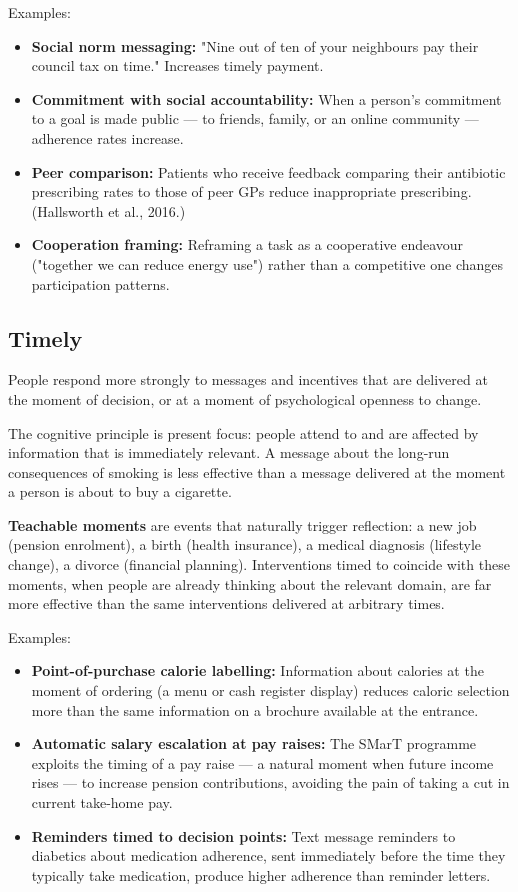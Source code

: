\documentclass[12pt, letterpaper]{article}
\begin{document}
Examples:
\begin{itemize}
\item \textbf{Social norm messaging:} "Nine out of ten of your neighbours pay their council tax on time." Increases timely payment.
\item \textbf{Commitment with social accountability:} When a person's commitment to a goal is made public --- to friends, family, or an online community --- adherence rates increase.
\item \textbf{Peer comparison:} Patients who receive feedback comparing their antibiotic prescribing rates to those of peer GPs reduce inappropriate prescribing. (Hallsworth et al., 2016.)
\item \textbf{Cooperation framing:} Reframing a task as a cooperative endeavour ("together we can reduce energy use") rather than a competitive one changes participation patterns.
\end{itemize}


\subsection{Timely}


People respond more strongly to messages and incentives that are delivered at the moment of decision, or at a moment of psychological openness to change.

The cognitive principle is present focus: people attend to and are affected by information that is immediately relevant. A message about the long-run consequences of smoking is less effective than a message delivered at the moment a person is about to buy a cigarette.

\textbf{Teachable moments} are events that naturally trigger reflection: a new job (pension enrolment), a birth (health insurance), a medical diagnosis (lifestyle change), a divorce (financial planning). Interventions timed to coincide with these moments, when people are already thinking about the relevant domain, are far more effective than the same interventions delivered at arbitrary times.

Examples:
\begin{itemize}
\item \textbf{Point-of-purchase calorie labelling:} Information about calories at the moment of ordering (a menu or cash register display) reduces caloric selection more than the same information on a brochure available at the entrance.
\item \textbf{Automatic salary escalation at pay raises:} The SMarT programme exploits the timing of a pay raise --- a natural moment when future income rises --- to increase pension contributions, avoiding the pain of taking a cut in current take-home pay.
\item \textbf{Reminders timed to decision points:} Text message reminders to diabetics about medication adherence, sent immediately before the time they typically take medication, produce higher adherence than reminder letters.
\end{itemize}
\end{document}
